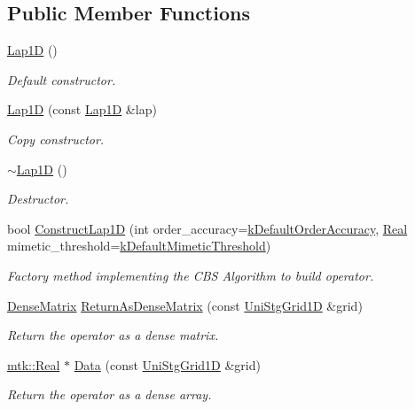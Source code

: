 \subsection*{Public Member Functions}
\begin{DoxyCompactItemize}
\item 
\hyperlink{classmtk_1_1Lap1D_a6fc2aeea35d4dfa49f17e625411f5a70}{Lap1\-D} ()
\begin{DoxyCompactList}\small\item\em Default constructor. \end{DoxyCompactList}\item 
\hyperlink{classmtk_1_1Lap1D_a95c3fdcd0c9e4c56e775a2a20a2fac42}{Lap1\-D} (const \hyperlink{classmtk_1_1Lap1D}{Lap1\-D} \&lap)
\begin{DoxyCompactList}\small\item\em Copy constructor. \end{DoxyCompactList}\item 
\hyperlink{classmtk_1_1Lap1D_ac0cb868243a66658cc46de5b818fa4e8}{$\sim$\-Lap1\-D} ()
\begin{DoxyCompactList}\small\item\em Destructor. \end{DoxyCompactList}\item 
bool \hyperlink{classmtk_1_1Lap1D_a685dcba88c08cf5b7b6c2aa4669a472c}{Construct\-Lap1\-D} (int order\-\_\-accuracy=\hyperlink{group__c01-roots_ga0d95560098eb36420511103637b6952f}{k\-Default\-Order\-Accuracy}, \hyperlink{group__c01-roots_gac080bbbf5cbb5502c9f00405f894857d}{Real} mimetic\-\_\-threshold=\hyperlink{group__c01-roots_ga35718d949bdc81a08a9cc8ebbe3478a2}{k\-Default\-Mimetic\-Threshold})
\begin{DoxyCompactList}\small\item\em Factory method implementing the C\-B\-S Algorithm to build operator. \end{DoxyCompactList}\item 
\hyperlink{classmtk_1_1DenseMatrix}{Dense\-Matrix} \hyperlink{classmtk_1_1Lap1D_a28672c735fa0d13e6204795b63aec4e2}{Return\-As\-Dense\-Matrix} (const \hyperlink{classmtk_1_1UniStgGrid1D}{Uni\-Stg\-Grid1\-D} \&grid)
\begin{DoxyCompactList}\small\item\em Return the operator as a dense matrix. \end{DoxyCompactList}\item 
\hyperlink{group__c01-roots_gac080bbbf5cbb5502c9f00405f894857d}{mtk\-::\-Real} $\ast$ \hyperlink{classmtk_1_1Lap1D_a86803e0da7ceb1ac20cc770d054ac040}{Data} (const \hyperlink{classmtk_1_1UniStgGrid1D}{Uni\-Stg\-Grid1\-D} \&grid)
\begin{DoxyCompactList}\small\item\em Return the operator as a dense array. \end{DoxyCompactList}\end{DoxyCompactItemize}
